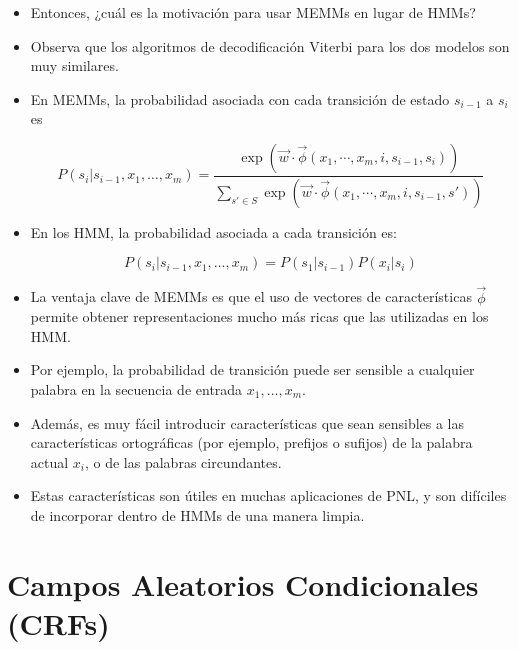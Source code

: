 \begin{itemize}

\item  Entonces, ¿cuál es la motivación para usar MEMMs en lugar de HMMs?

\item Observa que los algoritmos de decodificación Viterbi para los dos modelos son muy similares.

\item En MEMMs, la probabilidad asociada con cada transición de estado $s_{i-1}$ a $s_i$ es

 \begin{displaymath}
 P(s_i | s_{i-1}, x_1, \dots, x_m)  =  \frac{\exp (\vec{w}\cdot \vec{\phi}(x_1, \cdots, x_m, i, s_{i-1},s_i))}{\sum_{s' \in S} \exp (\vec{w}\cdot \vec{\phi}(x_1, \cdots, x_m, i, s_{i-1},s'))}
\end{displaymath}

\item En los HMM, la probabilidad asociada a cada transición es:

\begin{displaymath}
 P(s_i | s_{i-1}, x_1, \dots, x_m) = P(s_1|s_{i-1})P(x_i|s_i)
\end{displaymath}

\item La ventaja clave de MEMMs es que el uso de vectores de características $\vec{\phi}$ permite obtener representaciones mucho más ricas que las utilizadas en los HMM.

\item Por ejemplo, la probabilidad de transición puede ser sensible a cualquier palabra en la secuencia de entrada $x_1, \dots, x_m$.

\item Además, es muy fácil introducir características que sean sensibles a las características ortográficas (por ejemplo, prefijos o sufijos) de la palabra actual $x_i$, o de las palabras circundantes.

\item Estas características son útiles en muchas aplicaciones de PNL, y son difíciles de incorporar dentro de HMMs de una manera limpia.

\end{itemize}


\section{Campos Aleatorios Condicionales (CRFs)}

